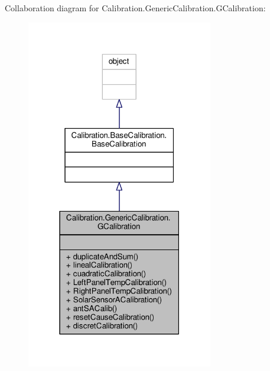 Collaboration diagram for Calibration.\+Generic\+Calibration.\+G\+Calibration\+:\nopagebreak
\begin{figure}[H]
\begin{center}
\leavevmode
\includegraphics[width=231pt]{class_calibration_1_1_generic_calibration_1_1_g_calibration__coll__graph}
\end{center}
\end{figure}

